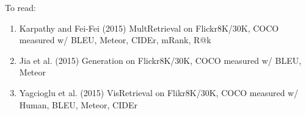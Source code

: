 \documentclass[conference]{IEEEtran}
\begin{document}
To read:
\begin{enumerate}
    \item Karpathy and Fei-Fei (2015) MultRetrieval on Flickr8K/30K, COCO measured w/ BLEU, Meteor, CIDEr, mRank, R@k
    \item Jia et al. (2015) Generation on Flickr8K/30K, COCO measured w/ BLEU, Meteor
    \item Yagcioglu et al. (2015) VisRetrieval on Flikr8K/30K, COCO measured w/ Human, BLEU, Meteor, CIDEr
\end{enumerate}
\cite{bernardi2016automatic}


\end{document}
